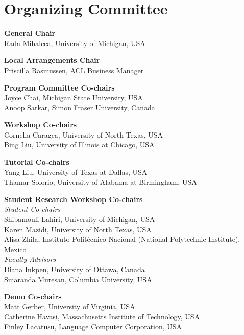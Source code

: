 \markboth{}{} %
\markright{}{} %

\section{Organizing Committee}{}

\setlength{\parindent}{0pt}

{\bf General Chair} \\
Rada Mihalcea, University of Michigan, USA

{\bf Local Arrangements Chair} \\
Priscilla Rasmussen, ACL Business Manager

{\bf Program Committee Co-chairs} \\
Joyce Chai, Michigan State University, USA \\
Anoop Sarkar, Simon Fraser University, Canada

{\bf Workshop Co-chairs} \\
Cornelia Caragea, University of North Texas, USA \\
Bing Liu, University of Illinois at Chicago, USA

{\bf Tutorial Co-chairs} \\
Yang Liu, University of Texas at Dallas, USA \\
Thamar Solorio, University of Alabama at Birmingham, USA

{\bf Student Research Workshop Co-chairs} \\
\indent \emph{Student Co-chairs} \\
\hspace*{0.2in} Shibamouli Lahiri, University of Michigan, USA \\
\hspace*{0.2in} Karen Mazidi, University of North Texas, USA \\
\hspace*{0.2in} Alisa Zhila, Instituto Politécnico Nacional (National Polytechnic Institute), Mexico \\
\emph{Faculty Advisors} \\
\hspace*{0.2in} Diana Inkpen, University of Ottawa, Canada \\
\hspace*{0.2in} Smaranda Muresan, Columbia University, USA

{\bf Demo Co-chairs} \\
Matt Gerber, University of Virginia, USA \\
Catherine Havasi, Massachusetts Institute of Technology, USA \\
Finley Lacatusu, Language Computer Corporation, USA

